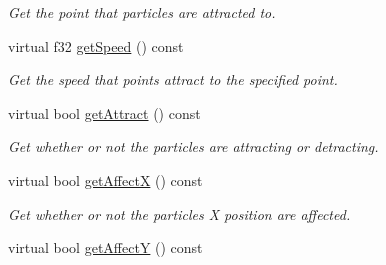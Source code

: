 \begin{DoxyCompactItemize}
\begin{DoxyCompactList}\small\item\em Get the point that particles are attracted to. \end{DoxyCompactList}\item 
\hypertarget{classirr_1_1scene_1_1_c_particle_attraction_affector_a75809985a373e6d7517f6b62cb9afa87}{virtual f32 \hyperlink{classirr_1_1scene_1_1_c_particle_attraction_affector_a75809985a373e6d7517f6b62cb9afa87}{get\-Speed} () const }\label{classirr_1_1scene_1_1_c_particle_attraction_affector_a75809985a373e6d7517f6b62cb9afa87}

\begin{DoxyCompactList}\small\item\em Get the speed that points attract to the specified point. \end{DoxyCompactList}\item 
\hypertarget{classirr_1_1scene_1_1_c_particle_attraction_affector_a51d5d0c4bbf77c4024e26a86f26ebeb1}{virtual bool \hyperlink{classirr_1_1scene_1_1_c_particle_attraction_affector_a51d5d0c4bbf77c4024e26a86f26ebeb1}{get\-Attract} () const }\label{classirr_1_1scene_1_1_c_particle_attraction_affector_a51d5d0c4bbf77c4024e26a86f26ebeb1}

\begin{DoxyCompactList}\small\item\em Get whether or not the particles are attracting or detracting. \end{DoxyCompactList}\item 
\hypertarget{classirr_1_1scene_1_1_c_particle_attraction_affector_a75d3c0985530408bbe6dbb2d508932de}{virtual bool \hyperlink{classirr_1_1scene_1_1_c_particle_attraction_affector_a75d3c0985530408bbe6dbb2d508932de}{get\-Affect\-X} () const }\label{classirr_1_1scene_1_1_c_particle_attraction_affector_a75d3c0985530408bbe6dbb2d508932de}

\begin{DoxyCompactList}\small\item\em Get whether or not the particles X position are affected. \end{DoxyCompactList}\item 
\hypertarget{classirr_1_1scene_1_1_c_particle_attraction_affector_aaf84fc32dce020b382660265567aab5d}{virtual bool \hyperlink{classirr_1_1scene_1_1_c_particle_attraction_affector_aaf84fc32dce020b382660265567aab5d}{get\-Affect\-Y} () const }\label{classirr_1_1scene_1_1_c_particle_attraction_affector_aaf84fc32dce020b382660265567aab5d}


\end{DoxyCompactItemize}
